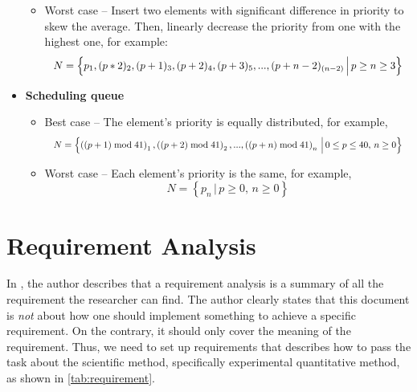 \documentclass[a4paper,11pt]{kth-mag}
\begin{document}
\begin{itemize}
\begin{itemize}
            \item Worst case -- Insert two elements with significant difference in priority to skew the average.
                Then, linearly decrease the priority from one with the highest one, for example:
                \begin{equation*}
                    \resizebox{.9\hsize}{!}{$N = \left\{p_1, (p*2)_2, (p+1)_3, (p+2)_4, (p+3)_5,..., (p+n-2)_{(n-2)} \, \Big| \, p \ge n \ge 3 \right\}$}
                \end{equation*}
        \end{itemize}
    \item \textbf{Scheduling queue}
        \begin{itemize}
            \item Best case -- The element's priority is equally distributed, for example,
                \begin{equation*}
                    \resizebox{.9\hsize}{!}{$N = \left\{\left((p+1) \bmod 41\right)_1, \left((p+2) \bmod 41\right)_2,..., \left((p+n) \bmod 41\right)_n \, \Big| \, 0 \le p \le 40, \, n \ge 0\right\}$}
                \end{equation*}
            \item Worst case -- Each element's priority is the same, for example,
                \begin{equation*}
                    N = \left\{p_{n} \, \Big| \, p \ge 0,\, n \ge 0 \right\}
                \end{equation*}
        \end{itemize}
\end{itemize}





\appendix
\addappheadtotoc
\chapter{Requirement Analysis}\label{app:A}

In \cite{web:requirementoverview}, the author describes that a requirement analysis is a summary of all the requirement the researcher can find.
The author clearly states that this document is \emph{not} about how one should implement something to achieve a specific requirement.
On the contrary, it should only cover the meaning of the requirement.
Thus, we need to set up requirements that describes how to pass the task about the scientific method, specifically experimental quantitative method, as shown in \cref{tab:requirement}.
\end{document}
